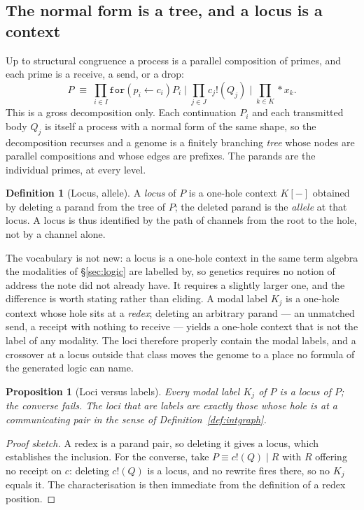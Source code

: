 \documentclass[11pt]{article}
\theoremstyle{plain}
\newtheorem{proposition}[theorem]{Proposition}
\theoremstyle{definition}
\newtheorem{definition}[theorem]{Definition}
\begin{document}
\subsection{The normal form is a tree, and a locus is a context}

Up to structural congruence a process is a parallel composition of primes, and each prime is a
receive, a send, or a drop:
\[
P \;\equiv\; \prod_{i \in I} \texttt{for}(p_i \leftarrow c_i)P_i
\;\Big|\; \prod_{j \in J} c_j!(Q_j)
\;\Big|\; \prod_{k \in K} \ast x_k .
\]
This is a gross decomposition only. Each continuation $P_i$ and each transmitted body $Q_j$ is itself
a process with a normal form of the same shape, so the decomposition recurses and a genome is a
finitely branching \emph{tree} whose nodes are parallel compositions and whose edges are prefixes. The
parands are the individual primes, at every level.

\begin{definition}[Locus, allele]
\label{def:locus}
A \emph{locus} of $P$ is a one-hole context $K[-]$ obtained by deleting a parand from the tree of $P$;
the deleted parand is the \emph{allele} at that locus. A locus is thus identified by the path of
channels from the root to the hole, not by a channel alone.
\end{definition}

The vocabulary is not new: a locus is a one-hole context in the same term algebra the modalities of
\S\ref{sec:logic} are labelled by, so genetics requires no notion of address the note did not
already have. It requires a slightly larger one, and the difference is worth stating rather than
eliding. A modal label $K_j$ is a one-hole context whose hole sits at a \emph{redex}; deleting an
arbitrary parand --- an unmatched send, a receipt with nothing to receive --- yields a one-hole
context that is not the label of any modality. The loci therefore properly contain the modal
labels, and a crossover at a locus outside that class moves the genome to a place no formula of the
generated logic can name.

\begin{proposition}[Loci versus labels]
\label{prop:locivlabels}
Every modal label $K_j$ of $P$ is a locus of $P$; the converse fails. The loci that are labels are
exactly those whose hole is at a communicating pair in the sense of
Definition~\ref{def:intgraph}.
\end{proposition}
\begin{proof}[Proof sketch]
A redex is a parand pair, so deleting it gives a locus, which establishes the inclusion. For the
converse, take $P \equiv c!(Q) \mid R$ with $R$ offering no receipt on $c$: deleting $c!(Q)$ is a
locus, and no rewrite fires there, so no $K_j$ equals it. The characterisation is then immediate
from the definition of a redex position.
\end{proof}
\end{document}
